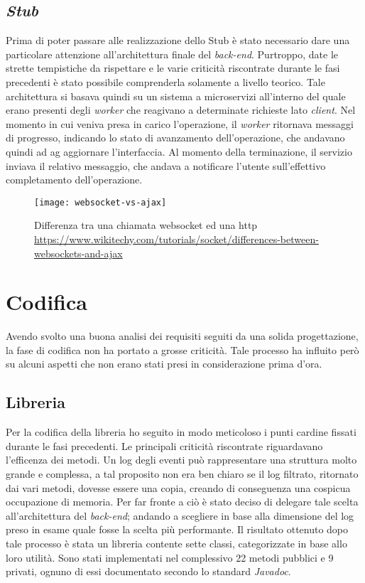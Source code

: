 \subsection{\textit{Stub}}
Prima di poter passare alle realizzazione dello Stub è stato necessario dare una particolare attenzione all'architettura finale del \textit{back-end}. Purtroppo, date le strette tempistiche da rispettare e le varie criticità riscontrate durante le fasi precedenti è stato possibile comprenderla solamente a livello teorico. Tale architettura si basava quindi su un sistema a microservizi all'interno del quale erano presenti degli \textit{worker} che reagivano a determinate richieste lato \textit{client}. Nel momento in cui veniva presa in carico l'operazione, il \textit{worker} ritornava messaggi di progresso, indicando lo stato di avanzamento dell'operazione, che andavano quindi ad ag aggiornare l'interfaccia. Al momento della terminazione, il servizio inviava il relativo messaggio, che andava a notificare l'utente sull'effettivo completamento dell'operazione.\\


\begin{figure}[!h] 
	\centering 
	\texttt{[image: websocket-vs-ajax]} 
	\caption{Differenza tra una chiamata websocket ed una http \url{https://www.wikitechy.com/tutorials/socket/differences-between-websockets-and-ajax}}
\end{figure}

\section{Codifica}
Avendo svolto una buona analisi dei requisiti seguiti da una solida progettazione, la  fase di codifica non ha portato a grosse criticità. Tale processo ha influito però su alcuni aspetti che non erano stati presi in considerazione prima d'ora.
\subsection{Libreria}
Per la codifica della libreria ho seguito in modo meticoloso i punti cardine fissati durante le fasi precedenti. Le principali criticità riscontrate riguardavano l'efficenza dei metodi. Un log degli eventi può rappresentare una struttura molto grande e complessa, a tal proposito non era ben chiaro se il log filtrato, ritornato dai vari metodi, dovesse essere una copia, creando di conseguenza una cospicua occupazione di memoria. Per far fronte a ciò è stato deciso di delegare tale scelta all'architettura del \textit{back-end}; andando a scegliere in base alla dimensione del log preso in esame quale fosse la scelta più performante. Il risultato ottenuto dopo tale processo è stata un libreria contente sette classi, categorizzate in base allo loro utilità. Sono stati implementati nel complessivo 22 metodi pubblici e 9 privati, ognuno di essi documentato secondo lo standard \textit{Javadoc}.

